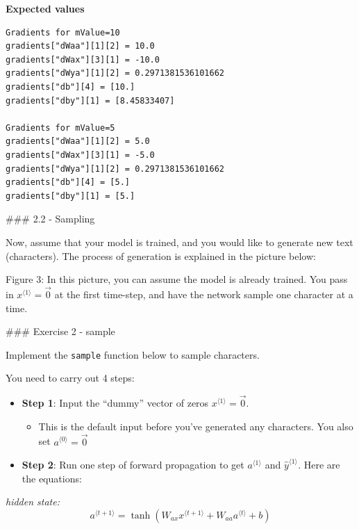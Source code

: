 \documentclass[11pt]{article}
\providecommand{\tightlist}{%
      \setlength{\itemsep}{0pt}\setlength{\parskip}{0pt}}
\begin{document}
    \textbf{Expected values}

\begin{verbatim}
Gradients for mValue=10
gradients["dWaa"][1][2] = 10.0
gradients["dWax"][3][1] = -10.0
gradients["dWya"][1][2] = 0.2971381536101662
gradients["db"][4] = [10.]
gradients["dby"][1] = [8.45833407]

Gradients for mValue=5
gradients["dWaa"][1][2] = 5.0
gradients["dWax"][3][1] = -5.0
gradients["dWya"][1][2] = 0.2971381536101662
gradients["db"][4] = [5.]
gradients["dby"][1] = [5.]
\end{verbatim}

    \#\#\# 2.2 - Sampling

Now, assume that your model is trained, and you would like to generate
new text (characters). The process of generation is explained in the
picture below:

Figure 3: In this picture, you can assume the model is already trained.
You pass in \(x^{\langle 1\rangle} = \vec{0}\) at the first time-step,
and have the network sample one character at a time.

    \#\#\# Exercise 2 - sample

Implement the \texttt{sample} function below to sample characters.

You need to carry out 4 steps:

\begin{itemize}
\tightlist
\item
  \textbf{Step 1}: Input the ``dummy'' vector of zeros
  \(x^{\langle 1 \rangle} = \vec{0}\).

  \begin{itemize}
  \tightlist
  \item
    This is the default input before you've generated any characters.
    You also set \(a^{\langle 0 \rangle} = \vec{0}\)
  \end{itemize}
\end{itemize}

    \begin{itemize}
\tightlist
\item
  \textbf{Step 2}: Run one step of forward propagation to get
  \(a^{\langle 1 \rangle}\) and \(\hat{y}^{\langle 1 \rangle}\). Here
  are the equations:
\end{itemize}

\emph{hidden state:}\\
\[ a^{\langle t+1 \rangle} = \tanh(W_{ax}  x^{\langle t+1 \rangle } + W_{aa} a^{\langle t \rangle } + b)\tag{1}\]
\end{document}
